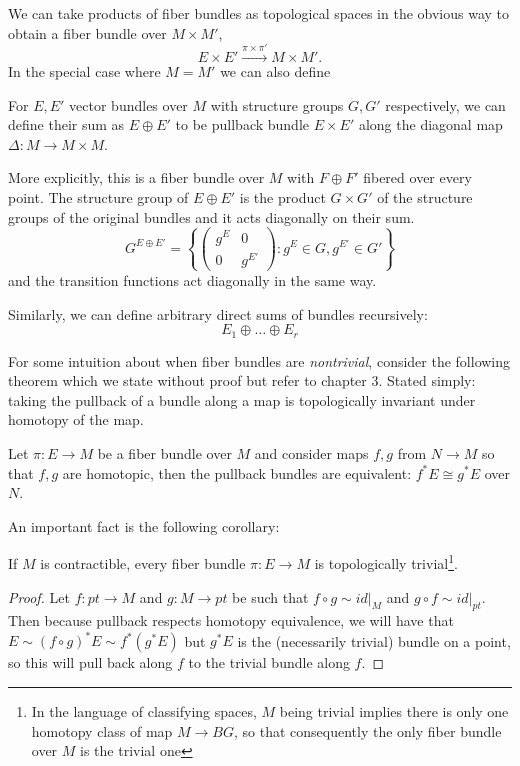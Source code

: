 		We can take products of fiber bundles as topological spaces in the obvious way to obtain a fiber bundle over $M \times M'$,
		\[
			E \times E' \xrightarrow{\pi \times \pi'} M \times M'.
		\]
		In the special case where $M = M'$ we can also define 
		\begin{defn}
			For $E, E'$ vector bundles over $M$ with structure groups $G, G'$ respectively, we can define their sum as $E \oplus E'$ to be pullback bundle $E \times E'$ along the diagonal map $\Delta: M \rightarrow M \times M$.
			
			More explicitly, this is a fiber bundle over $M$ with $F \oplus F'$ fibered over every point. 
			The structure group of $E \oplus E'$ is the product $G \times G'$ of the structure groups of the original bundles and it acts diagonally on their sum.
			\begin{equation}
				G^{E \oplus E'} = \left \{ \begin{pmatrix}
					g^E & 0 \\
					0 & g^{E'}
				\end{pmatrix} : g^E \in G, g^{E'} \in G' \right \}
			\end{equation}
			and the transition functions act diagonally in the same way. 
		\end{defn}
		Similarly, we can define arbitrary direct sums of bundles recursively:
		\begin{equation}
			E_1 \oplus \dots \oplus E_r 
		\end{equation}
		
		
		For some intuition about when fiber bundles are \emph{nontrivial}, consider the following theorem which we state without proof but refer to \cite{bott1982} chapter 3. Stated simply: taking the pullback of a bundle along a map is topologically invariant under homotopy of the map. 
		\begin{theorem}
			Let $\pi:E \rightarrow M$ be a fiber bundle over $M$ and consider maps $f, g$ from $N \rightarrow M$ so that $f, g$ are homotopic, then the pullback bundles are equivalent: $f^* E \cong g^* E$ over $N$.
		\end{theorem}
		An important fact is the following corollary:
		\begin{cor}
			If $M$ is contractible, every fiber bundle $\pi: E \rightarrow M$ is topologically trivial\footnote{In the language of classifying spaces, $M$ being trivial implies there is only one homotopy class of map $M \to BG$, so that consequently the only fiber bundle over $M$ is the trivial one}.
		\end{cor}
		\begin{proof}
			Let $f: pt \to M$ and $g: M \to pt$ be such that $f \circ g \sim id|_M$ and $g \circ f \sim id|_{pt}$. Then because pullback respects homotopy equivalence, we will have that $E \sim (f \circ g)^* E \sim f^* (g^*E)$ but $g^* E$ is the (necessarily trivial) bundle on a point, so this will pull back along $f$ to the trivial bundle along $f$.
		\end{proof}
		
